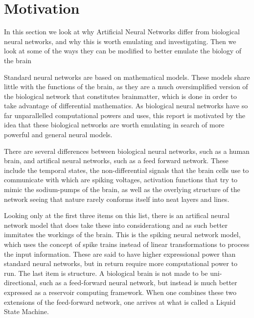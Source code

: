 \chapter{Motivation}

In this section we look at why Artificial Neural Networks differ from biological neural networks, and why this is worth emulating and investigating. Then we look at some of the ways they can be modified to better emulate the biology of the brain

Standard neural networks are based on mathematical models. These models share little with the functions of the brain, as they are a much oversimplified version of the biological network that constitutes brainmatter, which is done in order to take advantage of differential mathematics.
As biological neural networks have so far unparallelled computational powers and uses, this report is motivated by the idea that these biological networks are worth emulating in search of more powerful and general neural models.

There are several differences between biological neural networks, such as a human brain, and artifical neural networks, such as a feed forward network. These include the temporal states, the non-differential signals that the brain cells use to communicate with which are spiking voltages, activation functions that try to mimic the sodium-pumps of the brain, as well as the overlying structure of the network seeing that nature rarely conforms itself into neat layers and lines.

Looking only at the first three items on this list, there is an artifical neural network model that does take these into considerationg and as such better immitates the workings of the brain. This is the spiking neural network model, which uses the concept of spike trains instead of linear transformations to process the input information. These are said to have higher expressional power than standard neural networks, but in return require more computational power to run.
The last item is structure. A biological brain is not made to be uni-directional, such as a feed-forward neural network, but instead is much better expressed as a reservoir computing framework. When one combines these two extensions of the feed-forward network, one arrives at what is called a Liquid State Machine.